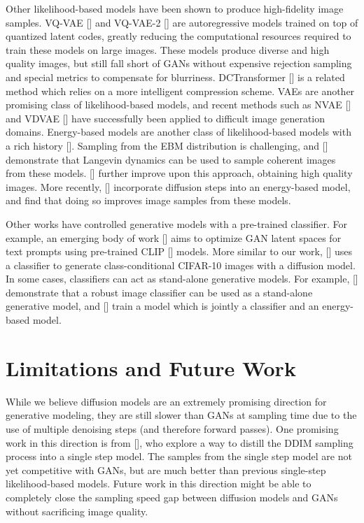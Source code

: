 Other likelihood-based models have been shown to produce high-fidelity image samples. VQ-VAE [] and VQ-VAE-2 [] are autoregressive models trained on top of quantized latent codes, greatly reducing the computational resources required to train these models on large images. These models produce diverse and high quality images, but still fall short of GANs without expensive rejection sampling and special metrics to compensate for blurriness. DCTransformer [] is a related method which relies on a more intelligent compression scheme. VAEs are another promising class of likelihood-based models, and recent methods such as NVAE [] and VDVAE [] have successfully been applied to difficult image generation domains. Energy-based models are another class of likelihood-based models with a rich history []. Sampling from the EBM distribution is challenging, and \citeauthor{genconv} [] demonstrate that Langevin dynamics can be used to sample coherent images from these models. \citeauthor{yilunenergy} [] further improve upon this approach, obtaining high quality images. More recently, \citeauthor{diffusionebm} [] incorporate diffusion steps into an energy-based model, and find that doing so improves image samples from these models.

Other works have controlled generative models with a pre-trained classifier. For example, an emerging body of work [] aims to optimize GAN latent spaces for text prompts using pre-trained CLIP [] models. More similar to our work, \citeauthor{sde} [] uses a classifier to generate class-conditional CIFAR-10 images with a diffusion model. In some cases, classifiers can act as stand-alone generative models. For example, \citeauthor{robustgeneration} [] demonstrate that a robust image classifier can be used as a stand-alone generative model, and \citeauthor{jem} [] train a model which is jointly a classifier and an energy-based model.

\section{Limitations and Future Work}

While we believe diffusion models are an extremely promising direction for generative modeling, they are still slower than GANs at sampling time due to the use of multiple denoising steps (and therefore forward passes). One promising work in this direction is from \citeauthor{ddimdistill} [], who explore a way to distill the DDIM sampling process into a single step model. The samples from the single step model are not yet competitive with GANs, but are much better than previous single-step likelihood-based models. Future work in this direction might be able to completely close the sampling speed gap between diffusion models and GANs without sacrificing image quality.

